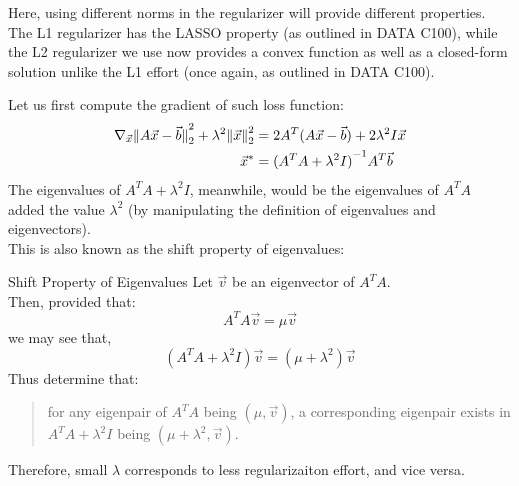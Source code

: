 Here, using different norms in the regularizer will provide different properties.
The L1 regularizer has the LASSO property (as outlined in DATA C100), while the L2 regularizer we use now provides a convex function as well as a closed-form solution unlike the L1 effort (once again, as outlined in DATA C100).

Let us first compute the gradient of such loss function:
\begin{align*}
    \nabla_{\vec{x}} \pnorm[2]{A \vec{x} - \vec{b}}{2} + \lambda^2 \pnorm[2]{\vec{x}}{2}
    &= 2A^T (A \vec{x} - \vec{b}) + 2 \lambda^2 I \vec{x} \\
    \vec{x}^* &= {(A^T A + \lambda^2 I)}^{-1} A^T \vec{b}
\end{align*}
The eigenvalues of $A^T A + \lambda^2 I$, meanwhile, would be the eigenvalues of $A^T A$ added the value $\lambda^2$ (by manipulating the definition of eigenvalues and eigenvectors). \\
This is also known as the shift property of eigenvalues:
\begin{ln-theorem}{Shift Property of Eigenvalues}{}
    Let $\vec{v}$ be an eigenvector of $A^T A$. \\
    Then, provided that:
    \[
        A^T A \vec{v} = \mu \vec{v}
    \]
    we may see that,
    \[
        (A^T A + \lambda^2 I) \vec{v} = (\mu + \lambda^2) \vec{v}
    \]
    Thus determine that:
    \begin{quote}
        for any eigenpair of $A^T A$ being $(\mu, \vec{v})$, a corresponding eigenpair exists in $A^T A + \lambda^2 I$ being $(\mu + \lambda^2, \vec{v})$.
    \end{quote}
\end{ln-theorem}
Therefore, small $\lambda$ corresponds to less regularizaiton effort, and vice versa.

